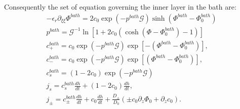 \documentclass[12pt]{extarticle}
\begin{document}
Consequently the set of equation governing the inner layer in the bath are:
\begin{gather}
-\epsilon_r\partial_{\xi\xi} \Phi^{bath} = 2c_0\exp(-p^{bath}\mathcal{G}) \sinh(\Phi^{bath}-\Phi_0^{bath})\\
p^{bath} = \mathcal{G}^{-1}\ln\left[1+2c_0\left(\cosh(\Phi-\Phi_0^{bath})-1\right)\right] \\
c^{bath}_+ = c_0\exp(-p^{bath}\mathcal{G})\exp[-(\Phi^{bath}-\Phi_0^{bath})],\\
c^{bath}_- = c_0\exp(-p^{bath}\mathcal{G}) \exp[(\Phi^{bath}-\Phi_0^{bath})],\\
 c^{bath}_s = (1-2c_0)\exp(-p^{bath}\mathcal{G})\\
j_s=c^{bath}_s\frac{dh}{dt}+(1-2c_0)\frac{dh}{dt},\\
j_\pm=c^{bath}_\pm\frac{dh}{dt}+ c_0 \frac{dh}{dt}  +\frac{D_\pm}{D_0}\left(\pm c_0 \partial_z \Phi_0+\partial_z c_0\right).
\end{gather}
\end{document}
